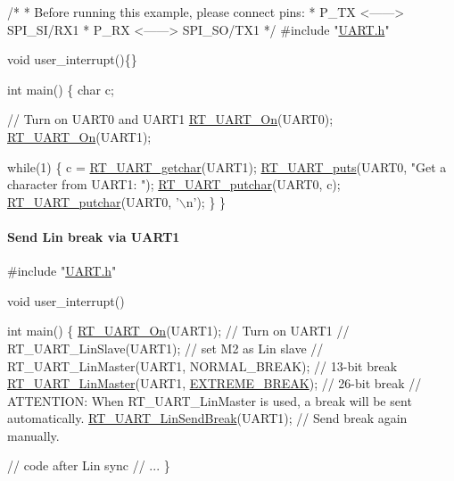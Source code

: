 \begin{DoxyCode}
\textcolor{comment}{/*}
\textcolor{comment}{ * Before running this example, please connect pins:}
\textcolor{comment}{ *      P\_TX <------> SPI\_SI/RX1}
\textcolor{comment}{ *      P\_RX <------> SPI\_SO/TX1  }
\textcolor{comment}{ */}
\textcolor{preprocessor}{#include "\mbox{\hyperlink{a00056}{UART.h}}"}

\textcolor{keywordtype}{void} user\_interrupt()\{\}

\textcolor{keywordtype}{int} main() \{
    \textcolor{keywordtype}{char} c;

    \textcolor{comment}{// Turn on UART0 and UART1}
    \mbox{\hyperlink{a00056_a7c1428a7b16eec7fe710679dd70b4069}{RT\_UART\_On}}(UART0);
    \mbox{\hyperlink{a00056_a7c1428a7b16eec7fe710679dd70b4069}{RT\_UART\_On}}(UART1);

    \textcolor{keywordflow}{while}(1) \{
        c = \mbox{\hyperlink{a00056_abc136df9d66fe27bf8ffcc319246591e}{RT\_UART\_getchar}}(UART1);
        \mbox{\hyperlink{a00056_ad61c03a00ccd43875563c16f97d61af7}{RT\_UART\_puts}}(UART0, \textcolor{stringliteral}{"Get a character from UART1: "});
        \mbox{\hyperlink{a00056_ab03e9e1a8d4d9b97583db27174086108}{RT\_UART\_putchar}}(UART0, c);
        \mbox{\hyperlink{a00056_ab03e9e1a8d4d9b97583db27174086108}{RT\_UART\_putchar}}(UART0, \textcolor{charliteral}{'\(\backslash\)n'});
    \}
\}
\end{DoxyCode}


\paragraph*{Send Lin break via U\+A\+R\+T1}


\begin{DoxyCode}
\textcolor{preprocessor}{#include "\mbox{\hyperlink{a00056}{UART.h}}"}

\textcolor{keywordtype}{void} user\_interrupt()

int main() \{
    \mbox{\hyperlink{a00056_a7c1428a7b16eec7fe710679dd70b4069}{RT\_UART\_On}}(UART1);                          \textcolor{comment}{// Turn on UART1}
    \textcolor{comment}{// RT\_UART\_LinSlave(UART1);                 // set M2 as Lin slave}
    \textcolor{comment}{// RT\_UART\_LinMaster(UART1, NORMAL\_BREAK);  // 13-bit break}
    \mbox{\hyperlink{a00056_ab0faf051e642e540b1b9c114eae242bd}{RT\_UART\_LinMaster}}(UART1, \mbox{\hyperlink{a00056_a7c76b3ed72795f2085873ee332fdab1b}{EXTREME\_BREAK}});    \textcolor{comment}{// 26-bit break}
    \textcolor{comment}{// ATTENTION: When RT\_UART\_LinMaster is used, a break will be sent automatically.}
    \mbox{\hyperlink{a00056_ad1e6c13693e5ea54a55ce78635617178}{RT\_UART\_LinSendBreak}}(UART1);                \textcolor{comment}{// Send break again manually.}

    \textcolor{comment}{// code after Lin sync}
    \textcolor{comment}{// ...}
\}
\end{DoxyCode}
 